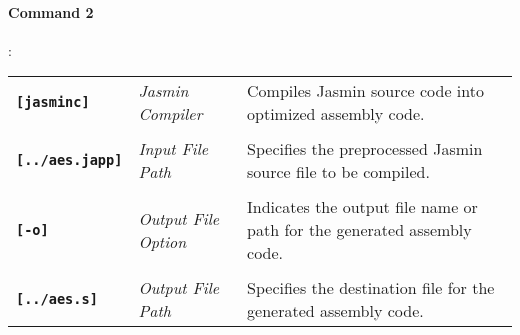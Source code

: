 \paragraph{Command 2}:
\begin{table}[h!]
\begin{tabularx}{\textwidth}{>{\raggedleft\arraybackslash}p{}>{\centering\arraybackslash}p{}p{}}
	\textbf{\texttt{[jasminc]}} & \textit{Jasmin Compiler} & Compiles Jasmin source code into optimized assembly code. \\ \\
	\textbf{\texttt{[../aes.japp]}} & \textit{Input File Path} & Specifies the preprocessed Jasmin source file to be compiled.
	\\ \\
	\textbf{\texttt{[-o]}} & \textit{Output File Option} & Indicates the output file name or path for the generated assembly code.\\ \\
	\textbf{\texttt{[../aes.s]}} & \textit{Output File Path} & Specifies the destination file for the generated assembly code.\\
\end{tabularx}
\end{table}

